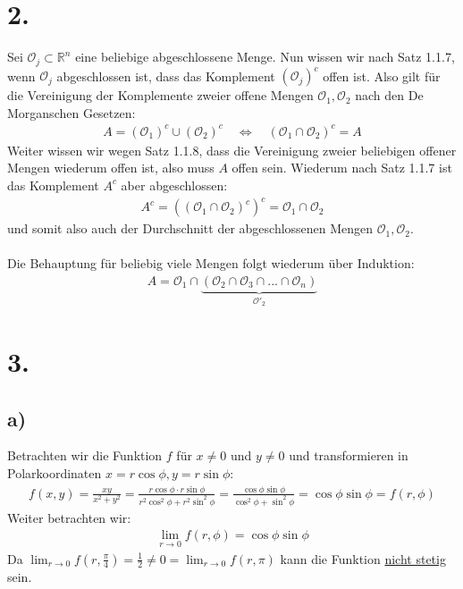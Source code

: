 \documentclass[11pt,a4paper]{article}
\newcommand {\Rn}	{\mathbb{R}^n}
\newcommand{\1}    	{\mathbbm{1}}
\begin{document}
	\section*{2.}	
	
	Sei \(\mathcal{O}_j \subset \Rn\) eine beliebige abgeschlossene Menge. Nun wissen wir nach Satz 1.1.7, wenn \(\mathcal{O}_j\) abgeschlossen ist, dass das Komplement \((\mathcal{O}_j)^c\) offen ist. Also gilt für die Vereinigung der Komplemente zweier offene Mengen \(\mathcal{O}_1, \mathcal{O}_2 \) nach den De Morganschen Gesetzen:
	\begin{align*}
		A = (\mathcal{O}_1)^c \cup (\mathcal{O}_2)^c \quad\Leftrightarrow\quad \left( \mathcal{O}_1 \cap \mathcal{O}_2 \right)^c = A
	\end{align*}
	Weiter wissen wir wegen Satz 1.1.8, dass die Vereinigung zweier beliebigen offener Mengen wiederum offen ist, also muss \(A\) offen sein.
	Wiederum nach Satz 1.1.7 ist das Komplement \(A^c\) aber abgeschlossen:
	\begin{align*}
		A^c = \left( \left( \mathcal{O}_1 \cap \mathcal{O}_2 \right)^c \right)^c = \mathcal{O}_1 \cap \mathcal{O}_2
	\end{align*}
	und somit also auch der Durchschnitt der abgeschlossenen Mengen \(\mathcal{O}_1, \mathcal{O}_2 \). \\
	\\
	\noindent
	Die Behauptung für beliebig viele Mengen folgt wiederum über Induktion:
	\begin{align*}
		A = \mathcal{O}_1 \cap \underbrace{\left( \mathcal{O}_2 \cap \mathcal{O}_3 \cap ... \cap \mathcal{O}_n \right)}_{\mathcal{O}'_2} 
	\end{align*}
	
	\section*{3.}
	\subsection*{a)}
	Betrachten wir die Funktion \(f\) für \(x \neq 0\) und \(y \neq 0\) und transformieren in Polarkoordinaten \(x = r \cos \phi, y = r \sin \phi \):
	\begin{align*}
		f(x,y) = \frac{xy}{x^2 + y^2} = \frac{r \cos \phi \cdot r \sin \phi}{r^2 \cos^2 \phi + r^2 \sin^2 \phi} = \frac{\cos \phi \sin \phi}{ \cos^2 \phi + \sin^2 \phi} = \cos \phi \sin \phi = f(r,\phi)
	\end{align*}
	Weiter betrachten wir:
	\begin{align*}
		\lim_{r \rightarrow 0} f(r,\phi) =\cos \phi \sin \phi 
	\end{align*}
	Da \(\lim_{r \rightarrow 0} f \left( r,\frac{\pi}{4} \right) = \frac{1}{2} \neq 0 = \lim_{r \rightarrow 0} f( r, \pi ) \) kann die Funktion \underline{nicht stetig} sein.
	
\end{document}

